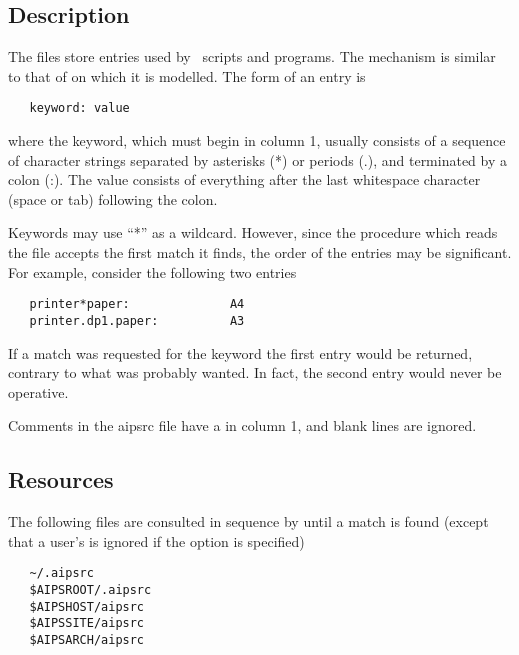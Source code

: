 \begin{synopsis}
\end{synopsis}

\subsection*{Description}

The  files store  entries used by \aipspp\ 
scripts and programs.  The mechanism is similar to that of 
on which it is modelled.  The form of an \file{aipsrc} entry is

\begin{verbatim}
   keyword: value
\end{verbatim}

\noindent
where the keyword, which must begin in column 1, usually consists of a
sequence of character strings separated by asterisks (*) or periods (.), and
terminated by a colon (:).  The value consists of everything after the last
whitespace character (space or tab) following the colon.

Keywords may use ``*'' as a wildcard.  However, since the procedure which
reads the \file{aipsrc} file accepts the first match it finds, the order of
the entries may be significant.  For example, consider the following two
\file{aipsrc} entries

\begin{verbatim}
   printer*paper:              A4
   printer.dp1.paper:          A3
\end{verbatim}

\noindent
If a match was requested for the keyword  the first
entry would be returned, contrary to what was probably wanted.  In fact, the
second entry would never be operative.

Comments in the aipsrc file have a \code{\#} in column 1, and blank lines are
ignored.

\subsection*{Resources}

The following  files are consulted in sequence by 
until a match is found (except that a user's \file{~/.aipsrc} is ignored if
the \exe{-i} option is specified)

\begin{verbatim}
   ~/.aipsrc
   $AIPSROOT/.aipsrc
   $AIPSHOST/aipsrc
   $AIPSSITE/aipsrc
   $AIPSARCH/aipsrc
\end{verbatim}


